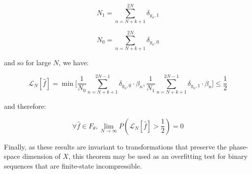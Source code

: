 \documentclass{article}
\begin{document}
\begin{equation}
N_1 = \sum_{n=N+k+1}^{2N} \delta_{y_n,1}	
\end{equation}

\begin{equation}
N_0 = \sum_{n=N+k+1}^{2N} \delta_{y_n,0}	
\end{equation}

and so for large $N$, we have: 

\begin{equation}
\mathcal{L}_N[\hat{f}] = \min \Big[\frac{1}{N_0} \sum_{n=N+k+1}^{2N-1} \delta_{y_n,0} \cdot \beta_n,  \frac{1}{N_1} \sum_{n=N+k+1}^{2N-1} \delta_{y_n,1} \cdot \beta_n \Big] \leq \frac{1}{2}
\end{equation}

and therefore:


\begin{equation}
\forall \hat{f} \in F_{\theta}, \lim_{N \to \infty} P(\mathcal{L}_N[\hat{f}] > \frac{1}{2}) = 0
\end{equation}

Finally, as these results are invariant to transformations that preserve the 
phase-space dimension of $X$, this theorem may be used as an overfitting test 
for binary sequences that are finite-state incompressible. 
\end{document}
